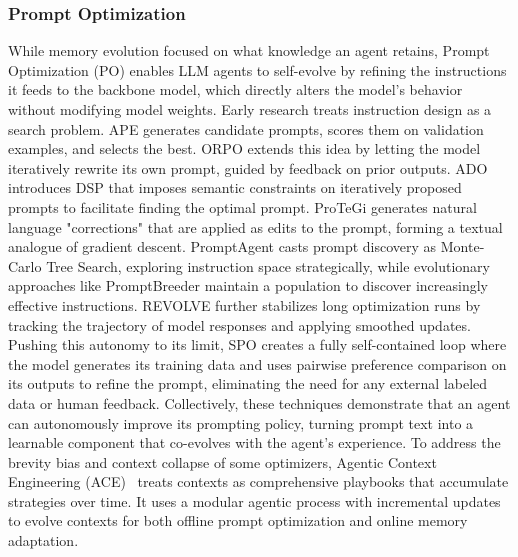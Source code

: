 \subsubsection{Prompt Optimization}
While memory evolution focused on what knowledge an agent retains, Prompt Optimization (PO) enables LLM agents to self-evolve by refining the instructions it feeds to the backbone model, which directly alters the model's behavior without modifying model weights\citep{ramnath2025systematic}. Early research treats instruction design as a search problem. APE\citep{zhou2022large} generates candidate prompts, scores them on validation examples, and selects the best. ORPO\citep{yang2023large} extends this idea by letting the model iteratively rewrite its own prompt, guided by feedback on prior outputs. ADO\citep{lin2025ado} introduces DSP that imposes semantic constraints on iteratively proposed prompts to facilitate finding the optimal prompt. ProTeGi\citep{pryzant2023automatic} generates natural language "corrections" that are applied as edits to the prompt, forming a textual analogue of gradient descent. PromptAgent\citep{wang2023promptagent} casts prompt discovery as Monte-Carlo Tree Search, exploring instruction space strategically, while evolutionary approaches like PromptBreeder\citep{fernando2023promptbreeder} maintain a population to discover increasingly effective instructions. REVOLVE\citep{zhang2024revolve} further stabilizes long optimization runs by tracking the trajectory of model responses and applying smoothed updates. Pushing this autonomy to its limit, SPO\citep{xiang2025self} creates a fully self-contained loop where the model generates its training data and uses pairwise preference comparison on its outputs to refine the prompt, eliminating the need for any external labeled data or human feedback. Collectively, these techniques demonstrate that an agent can autonomously improve its prompting policy, turning prompt text into a learnable component that co-evolves with the agent’s experience. To address the brevity bias and context collapse of some optimizers, Agentic Context Engineering (ACE)~\citep{zhang2025ACE} treats contexts as comprehensive playbooks that accumulate strategies over time. It uses a modular agentic process with incremental updates to evolve contexts for both offline prompt optimization and online memory adaptation.


